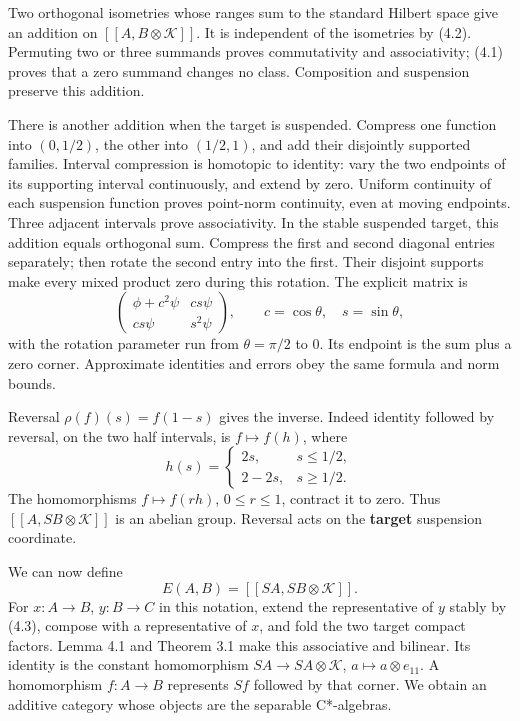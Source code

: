 \documentclass[
  11pt,
]{article}
\begin{document}
Two orthogonal isometries whose ranges sum to the standard Hilbert space
give an addition on \([[A,B\otimes\mathcal K]]\). It is independent of
the isometries by (4.2). Permuting two or three summands proves
commutativity and associativity; (4.1) proves that a zero summand
changes no class. Composition and suspension preserve this addition.

There is another addition when the target is suspended. Compress one
function into \((0,1/2)\), the other into \((1/2,1)\), and add their
disjointly supported families. Interval compression is homotopic to
identity: vary the two endpoints of its supporting interval
continuously, and extend by zero. Uniform continuity of each suspension
function proves point-norm continuity, even at moving endpoints. Three
adjacent intervals prove associativity. In the stable suspended target,
this addition equals orthogonal sum. Compress the first and second
diagonal entries separately; then rotate the second entry into the
first. Their disjoint supports make every mixed product zero during this
rotation. The explicit matrix is \[
\begin{pmatrix}
\phi+c^2\psi&cs\psi\\ c s\psi&s^2\psi
\end{pmatrix},\qquad c=\cos\theta,\quad s=\sin\theta,
\tag{4.4}
\] with the rotation parameter run from \(\theta=\pi/2\) to \(0\). Its
endpoint is the sum plus a zero corner. Approximate identities and
errors obey the same formula and norm bounds.

Reversal \(\rho(f)(s)=f(1-s)\) gives the inverse. Indeed identity
followed by reversal, on the two half intervals, is \(f\mapsto f(h)\),
where \[
h(s)=\begin{cases}2s,&s\leq1/2,\\2-2s,&s\geq1/2.\end{cases}
\tag{4.5}
\] The homomorphisms \(f\mapsto f(rh)\), \(0\leq r\leq1\), contract it
to zero. Thus \([[A,SB\otimes\mathcal K]]\) is an abelian group.
Reversal acts on the \textbf{target} suspension coordinate.

We can now define \[
E(A,B)=[[SA,SB\otimes\mathcal K]].
\tag{4.6}
\] For \(x:A\to B\), \(y:B\to C\) in this notation, extend the
representative of \(y\) stably by (4.3), compose with a representative
of \(x\), and fold the two target compact factors. Lemma 4.1 and Theorem
3.1 make this associative and bilinear. Its identity is the constant
homomorphism \(SA\to SA\otimes\mathcal K\),
\(a\mapsto a\otimes e_{11}\). A homomorphism \(f:A\to B\) represents
\(Sf\) followed by that corner. We obtain an additive category whose
objects are the separable C*-algebras.
\end{document}
